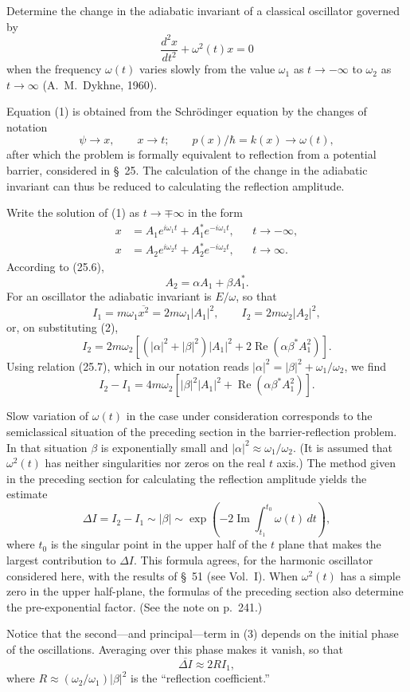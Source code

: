 \ProblemHeading

Determine the change in the adiabatic invariant of a classical oscillator governed by
\begin{equation}
 \frac{d^2x}{dt^2}+\omega^2(t)x=0
 \tag{1}
\end{equation}
when the frequency $\omega(t)$ varies slowly from the value $\omega_1$ as $t\to-\infty$ to $\omega_2$ as $t\to\infty$ (A.~M.~Dykhne, 1960).

\SolutionHeading Equation (1) is obtained from the Schrödinger equation by the changes of notation
\[
 \psi\to x,\qquad x\to t;\qquad p(x)/\hbar=k(x)\to\omega(t),
\]
after which the problem is formally equivalent to reflection from a potential barrier, considered in §~25. The calculation of the change in the adiabatic invariant can thus be reduced to calculating the reflection amplitude.

Write the solution of (1) as $t\to\mp\infty$ in the form
\[
 \begin{aligned}
 x&=A_1e^{i\omega_1t}+A_1^*e^{-i\omega_1t},&&t\to-\infty,\\
 x&=A_2e^{i\omega_2t}+A_2^*e^{-i\omega_2t},&&t\to\infty.
 \end{aligned}
\]
According to (25.6),
\begin{equation}
 A_2=\alpha A_1+\beta A_1^*.
 \tag{2}
\end{equation}
For an oscillator the adiabatic invariant is $E/\omega$, so that
\[
 I_1=m\omega_1\overline{x^2}=2m\omega_1|A_1|^2,\qquad
 I_2=2m\omega_2|A_2|^2,
\]
or, on substituting (2),
\[
 I_2=2m\omega_2[(|\alpha|^2+|\beta|^2)|A_1|^2+2\operatorname{Re}(\alpha\beta^*A_1^2)].
\]
Using relation (25.7), which in our notation reads $|\alpha|^2=|\beta|^2+\omega_1/\omega_2$, we find
\begin{equation}
 I_2-I_1=4m\omega_2[|\beta|^2|A_1|^2+\operatorname{Re}(\alpha\beta^*A_1^2)].
 \tag{3}
\end{equation}

Slow variation of $\omega(t)$ in the case under consideration corresponds to the semiclassical situation of the preceding section in the barrier-reflection problem. In that situation $\beta$ is exponentially small and $|\alpha|^2\approx\omega_1/\omega_2$. (It is assumed that $\omega^2(t)$ has neither singularities nor zeros on the real $t$ axis.) The method given in the preceding section for calculating the reflection amplitude yields the estimate
\[
 \Delta I=I_2-I_1\sim|\beta|\sim
 \exp\left(-2\operatorname{Im}\int_{t_1}^{t_0}\omega(t)\,dt\right),
\]
where $t_0$ is the singular point in the upper half of the $t$ plane that makes the largest contribution to $\Delta I$. This formula agrees, for the harmonic oscillator considered here, with the results of §~51 (see Vol.~I). When $\omega^2(t)$ has a simple zero in the upper half-plane, the formulas of the preceding section also determine the pre-exponential factor. (See the note on p.~241.)

Notice that the second---and principal---term in (3) depends on the initial phase of the oscillations. Averaging over this phase makes it vanish, so that
\[
 \overline{\Delta I}\approx2RI_1,
\]
where $R\approx(\omega_2/\omega_1)|\beta|^2$ is the ``reflection coefficient.''
